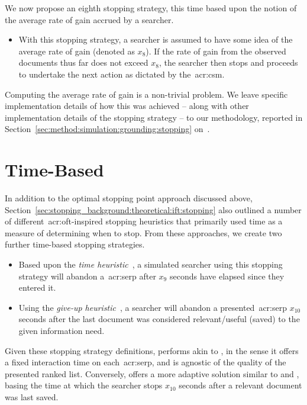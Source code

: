 We now propose an eighth stopping strategy, this time based upon the notion of the average rate of gain accrued by a searcher.

\begin{itemize}
    \item{ With this stopping strategy, a searcher is assumed to have some idea of the average rate of gain (denoted as $x_8$). If the rate of gain from the observed documents thus far does not exceed $x_8$, the searcher then stops and proceeds to undertake the next action as dictated by the~\gls{acr:csm}.}
\end{itemize}

Computing the average rate of gain is a non-trivial problem. We leave specific implementation details of how this was achieved -- along with other implementation details of the stopping strategy -- to our methodology, reported in Section~\ref{sec:method:simulation:grounding:stopping} on~\pageref{sec:method:simulation:grounding:stopping}.

\section{Time-Based}\label{sec:strategies:time}
In addition to the optimal stopping point approach discussed above, Section~\ref{sec:stopping_background:theoretical:ift:stopping} also outlined a number of different~\gls{acr:oft}-inspired stopping heuristics that primarily used time as a measure of determining when to stop. From these approaches, we create two further time-based stopping strategies.

\begin{itemize}
    \item{ Based upon the \emph{time heuristic}~\citep{charles1972behaviour, krebs1973time_rule}, a simulated searcher using this stopping strategy will abandon a~\gls{acr:serp} after $x_9$ seconds have elapsed since they entered it.}
    
    \item{ Using the \emph{give-up heuristic}~\citep{krebs1974leave_after_rule}, a searcher will abandon a presented~\gls{acr:serp} $x_{10}$ seconds after the last document was considered relevant/useful (saved) to the given information need.}
\end{itemize}

Given these stopping strategy definitions,  performs akin to , in the sense it offers a fixed interaction time on each~\gls{acr:serp}, and is agnostic of the quality of the presented ranked list. Conversely,  offers a more adaptive solution similar to  and , basing the time at which the searcher stops $x_{10}$ seconds after a relevant document was last saved.

